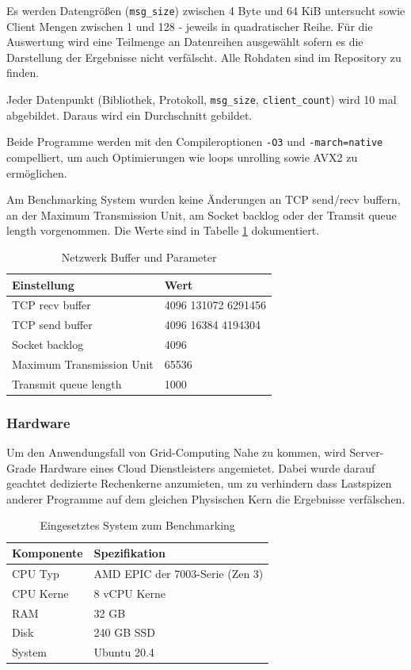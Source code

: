 \documentclass{article}
\begin{document}
Es werden Datengrößen (\texttt{msg\_size}) zwischen 4 Byte und 64 KiB
untersucht sowie Client Mengen zwischen 1 und 128 - jeweils in quadratischer Reihe. Für
die Auswertung wird eine Teilmenge an Datenreihen ausgewählt sofern es die Darstellung
der Ergebnisse nicht verfälscht. Alle Rohdaten sind im Repository zu finden.

Jeder Datenpunkt (Bibliothek, Protokoll, \texttt{msg\_size}, \texttt{client\_count}) 
wird 10 mal abgebildet. Daraus wird ein Durchschnitt gebildet.

Beide Programme werden mit den Compileroptionen \texttt{-O3} und
\texttt{-march=native} compelliert, um auch Optimierungen wie loops
unrolling sowie AVX2 zu er\-mö\-glich\-en.

Am Benchmarking System wurden keine Änderungen an TCP send/recv buffern, an der Maximum Transmission Unit, am Socket backlog oder der Tramsit queue length vorgenommen. Die Werte sind in Tabelle \ref{table:tcp_settings} dokumentiert.

\begin{table}[h!]
\centering
\begin{tabular}{l | l} 
    Einstellung & Wert \\
    \hline
    TCP recv buffer & 4096	131072 6291456 \\
    TCP send buffer & 4096	16384 4194304 \\
    Socket backlog & 4096 \\
    Maximum Transmission Unit & 65536 \\
    Transmit queue length & 1000 \\
 \hline
\end{tabular}
\caption{Netzwerk Buffer und Parameter}
\label{table:tcp_settings}
\end{table}

\subsubsection{Hardware}
Um den Anwendungsfall von Grid-Computing Nahe zu kommen, wird Server-Grade
Hardware eines Cloud Dienstleisters angemietet. Dabei wurde darauf geachtet dedizierte
Rechenkerne anzumieten, um zu verhindern dass Lastspizen anderer Programme 
auf dem gleichen Physischen Kern die Ergebnisse verfälschen. 

\begin{table}[h!]
\centering
\begin{tabular}{l | l} 
    Komponente & Spezifikation \\
    \hline
     CPU Typ & AMD EPIC der 7003-Serie (Zen 3) \\
     CPU Kerne & 8 vCPU Kerne \\
     RAM & 32 GB \\
     Disk & 240 GB SSD \\
     System & Ubuntu 20.4 \\  [1ex] 
 \hline
\end{tabular}
\caption{Eingesetztes System zum Benchmarking}
\label{table:used_hardware}
\end{table}
\end{document}
